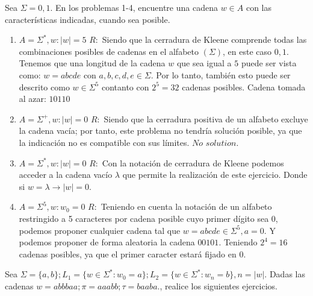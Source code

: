 Sea $\Sigma = {0,1}$. En los problemas 1-4, encuentre una cadena $w \in A$ con las características indicadas, cuando sea posible.

\begin{enumerate}
    \item $A = \Sigma^{*}, w : |w| = 5$
        \subitem $R: $ Siendo que la cerradura de Kleene comprende todas las combinaciones posibles de cadenas en el alfabeto $(\Sigma)$, en este caso {$0,1$}. Tenemos que una longitud de la cadena $w$ que sea igual a $5$ puede ser vista como: $w = abcde$ con $a,b,c,d,e \in \Sigma$. Por lo tanto, también esto puede ser descrito como $w \in \Sigma^{5}$ contanto con $2^5 = 32$ cadenas posibles. Cadena tomada al azar: $10110$
    \item $A = \Sigma^{+}, w : |w| = 0$
        \subitem $R: $ Siendo que la cerradura positiva de un alfabeto excluye la cadena vacía; por tanto, este problema no tendría solución posible, ya que la indicación no es compatible con sus límites. $No$ $solution.$
    \item $A = \Sigma^{*}, w : |w| = 0$
        \subitem $R: $ Con la notación de cerradura de Kleene podemos acceder a la cadena vacío $\lambda$ que permite la realización de este ejercicio. Donde si $w = \lambda \rightarrow |w| = 0$.
    \item $A = \Sigma^{5}, w : w_0 = 0$
        \subitem $R :$ Teniendo en cuenta la notación de un alfabeto restringido a 5 caracteres por cadena posible cuyo primer dígito sea 0, podemos proponer cualquier cadena tal que $w = abcde \in \Sigma^5, a = 0$. Y podemos proponer de forma aleatoria la cadena $00101$. Teniendo $2^4 = 16$ cadenas posibles, ya que el primer caracter estará fijado en 0.
\end{enumerate}

Sea $\Sigma = \{a,b\}; L_1 = \{w\in\Sigma^* : w_0 = a\}; L_2 = \{w\in\Sigma^* : w_n = b\}, n = |w|$. Dadas las cadenas $w=abbbaa; \pi = aaabb; \tau = baaba.$, realice los siguientes ejercicios.

